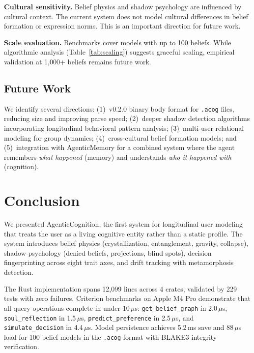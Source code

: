 \documentclass[10pt, twocolumn]{article}
\begin{document}
\textbf{Cultural sensitivity.} Belief physics and shadow psychology are influenced by cultural context. The current system does not model cultural differences in belief formation or expression norms. This is an important direction for future work.

\textbf{Scale evaluation.} Benchmarks cover models with up to 100 beliefs. While algorithmic analysis (Table~\ref{tab:scaling}) suggests graceful scaling, empirical validation at 1{,}000+ beliefs remains future work.

\subsection{Future Work}

We identify several directions: (1)~v0.2.0 binary body format for \texttt{.acog} files, reducing size and improving parse speed; (2)~deeper shadow detection algorithms incorporating longitudinal behavioral pattern analysis; (3)~multi-user relational modeling for group dynamics; (4)~cross-cultural belief formation models; and (5)~integration with AgenticMemory for a combined system where the agent remembers \emph{what happened} (memory) and understands \emph{who it happened with} (cognition).


\section{Conclusion}
\label{sec:conclusion}

We presented AgenticCognition, the first system for longitudinal user modeling that treats the user as a living cognitive entity rather than a static profile. The system introduces belief physics (crystallization, entanglement, gravity, collapse), shadow psychology (denied beliefs, projections, blind spots), decision fingerprinting across eight trait axes, and drift tracking with metamorphosis detection.

The Rust implementation spans 12{,}099 lines across 4 crates, validated by 229 tests with zero failures. Criterion benchmarks on Apple M4 Pro demonstrate that all query operations complete in under 10\,$\mu$s: \texttt{get\_belief\_graph} in 2.0\,$\mu$s, \texttt{soul\_reflection} in 1.5\,$\mu$s, \texttt{predict\_preference} in 2.5\,$\mu$s, and \texttt{simulate\_decision} in 4.4\,$\mu$s. Model persistence achieves 5.2\,ms save and 88\,$\mu$s load for 100-belief models in the \texttt{.acog} format with BLAKE3 integrity verification.
\end{document}
